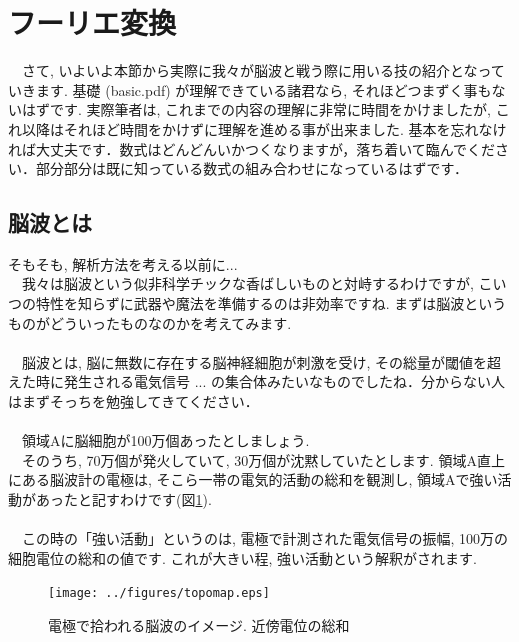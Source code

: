 \documentclass[11pt,a4paper]{ujreport} 	%
\begin{document}
\section{フーリエ変換}
　さて, いよいよ本節から実際に我々が脳波と戦う際に用いる技の紹介となっていきます. 基礎 (basic.pdf) が理解できている諸君なら, それほどつまずく事もないはずです. 実際筆者は, これまでの内容の理解に非常に時間をかけましたが, これ以降はそれほど時間をかけずに理解を進める事が出来ました. 基本を忘れなければ大丈夫です．数式はどんどんいかつくなりますが，落ち着いて臨んでください．部分部分は既に知っている数式の組み合わせになっているはずです．
\subsection{脳波とは}
そもそも, 解析方法を考える以前に...\\
　我々は脳波という似非科学チックな香ばしいものと対峙するわけですが, こいつの特性を知らずに武器や魔法を準備するのは非効率ですね. まずは脳波というものがどういったものなのかを考えてみます. \\
\\
　脳波とは, 脳に無数に存在する脳神経細胞が刺激を受け, その総量が閾値を超えた時に発生される電気信号 ... の集合体みたいなものでしたね．分からない人はまずそっちを勉強してきてください．\\
\\
　領域Aに脳細胞が100万個あったとしましょう. \\
　そのうち, 70万個が発火していて, 30万個が沈黙していたとします. 領域A直上にある脳波計の電極は, そこら一帯の電気的活動の総和を観測し, 領域Aで強い活動があったと記すわけです(図\ref{im:topo}).\\
\\
　この時の「強い活動」というのは, 電極で計測された電気信号の振幅, 100万の細胞電位の総和の値です. これが大きい程, 強い活動という解釈がされます.\\

\begin{figure}[H]
\label{im:topo}
  \centering
  \texttt{[image: ../figures/topomap.eps]}
  \caption{電極で拾われる脳波のイメージ. 近傍電位の総和}
\end{figure}
\end{document}
